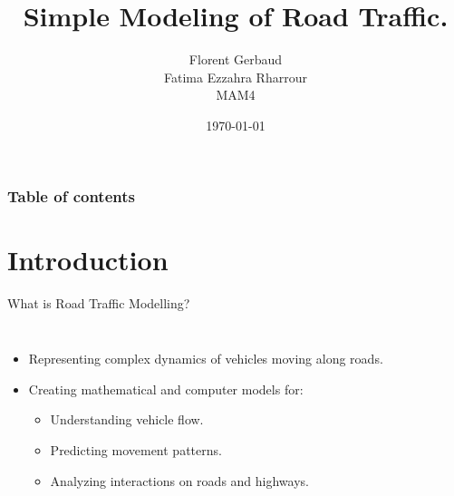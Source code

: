 \documentclass{beamer}
\title[2023-2024]{Simple Modeling of Road Traffic.}
\author{Florent Gerbaud \\ Fatima Ezzahra Rharrour \\ MAM4}
\institute[Polytech Nice-Sophia] %
{
Supervisor: \\ %
\medskip
{Didier Auroux} %
}
\date{\today} %
\begin{document}
\begin{frame}
\titlepage 
\end{frame}

\begin{frame}
\frametitle{Table of contents} 
\tableofcontents
\end{frame}


\section{Introduction} 
\begin{frame}{What is Road Traffic Modelling?}
	\begin{columns}
		\begin{itemize}
			\item Representing complex dynamics of vehicles moving along roads.
			\item Creating mathematical and computer models for:
			\begin{itemize}
				\item Understanding vehicle flow.
				\item Predicting movement patterns.
				\item Analyzing interactions on roads and highways.
			\end{itemize}
		\end{itemize}
		
		\begin{center}
			\centering
		\end{center}
	\end{columns}
\end{frame}
\end{document}
